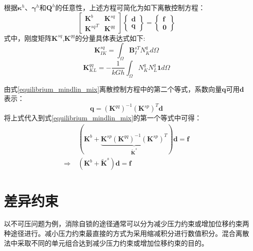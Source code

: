 根据$\boldsymbol\kappa^h$、$\boldsymbol\gamma^h$和$\boldsymbol Q^h$的任意性，上述方程可简化为如下离散控制方程：
\begin{equation} \label{equilibrium_mindlin_mix}
    \begin{bmatrix}\boldsymbol{K}^{b}&\boldsymbol{K}^{sq}\\{\boldsymbol{K}^{sq}}^T&\boldsymbol{K}^{qq}\end{bmatrix}
    \begin{Bmatrix}\boldsymbol{d}\\\boldsymbol{q}\end{Bmatrix}=
    \begin{Bmatrix}\boldsymbol{f}\\\boldsymbol{0}\end{Bmatrix}
\end{equation}
式中，刚度矩阵$\boldsymbol K^{sq}$,$\boldsymbol K^{qq}$的分量具体表达式如下:
\begin{equation} 
    \boldsymbol K^{sq}_{IK} = \int_\Omega \boldsymbol B^{sT}_I N^q_K d\Omega
\end{equation} 
\begin{equation} 
    \boldsymbol K^{qq}_{KL} = -\frac{1}{kGh} \int_\Omega N^q_K N^q_L \boldsymbol 1 d\Omega
\end{equation}

由式\eqref{equilibrium_mindlin_mix}离散控制方程中的第二个等式，系数向量$\boldsymbol q$可用$\boldsymbol d$表示：
\begin{equation}
    \boldsymbol q =(\boldsymbol K^{qq})^{-1} (\boldsymbol K^{sp})^T \boldsymbol d
\end{equation}
将上式代入到式\eqref{equilibrium_mindlin_mix}的第一个等式中可得：
\begin{equation}\label{equilibrium_mindlin_projection}
    \begin{split}
        &(\boldsymbol K^{b} + \underbrace{\boldsymbol K^{sp}(\boldsymbol K^{qq})^{-1}(\boldsymbol K^{sp})^{T}}_{\tilde{\boldsymbol K}^s}) \boldsymbol d = \boldsymbol f \\
        \Rightarrow\;& (\boldsymbol K^b + \tilde{\boldsymbol K}^s)\boldsymbol d = \boldsymbol f
    \end{split}
\end{equation}

\section{差异约束}
以不可压问题为例，消除自锁的途径通常可以分为减少压力约束或增加位移约束两种途径进行。减小压力约束最直接的方式为采用缩减积分进行数值积分。混合离散法中采取不同的单元组合达到减少压力约束或增加位移约束的目的。
